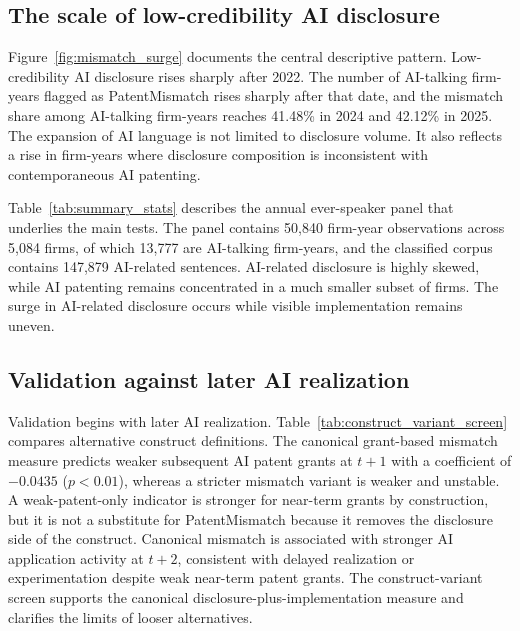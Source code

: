 \subsection{The scale of low-credibility AI disclosure}

Figure~\ref{fig:mismatch_surge} documents the central descriptive pattern. Low-credibility AI disclosure rises sharply after 2022. The number of AI-talking firm-years flagged as PatentMismatch rises sharply after that date, and the mismatch share among AI-talking firm-years reaches 41.48\% in 2024 and 42.12\% in 2025. The expansion of AI language is not limited to disclosure volume. It also reflects a rise in firm-years where disclosure composition is inconsistent with contemporaneous AI patenting.

Table~\ref{tab:summary_stats} describes the annual ever-speaker panel that underlies the main tests. The panel contains 50,840 firm-year observations across 5,084 firms, of which 13,777 are AI-talking firm-years, and the classified corpus contains 147,879 AI-related sentences. AI-related disclosure is highly skewed, while AI patenting remains concentrated in a much smaller subset of firms. The surge in AI-related disclosure occurs while visible implementation remains uneven.



\subsection{Validation against later AI realization}

Validation begins with later AI realization. Table~\ref{tab:construct_variant_screen} compares alternative construct definitions. The canonical grant-based mismatch measure predicts weaker subsequent AI patent grants at $t+1$ with a coefficient of $-0.0435$ ($p<0.01$), whereas a stricter mismatch variant is weaker and unstable. A weak-patent-only indicator is stronger for near-term grants by construction, but it is not a substitute for PatentMismatch because it removes the disclosure side of the construct. Canonical mismatch is associated with stronger AI application activity at $t+2$, consistent with delayed realization or experimentation despite weak near-term patent grants. The construct-variant screen supports the canonical disclosure-plus-implementation measure and clarifies the limits of looser alternatives.



